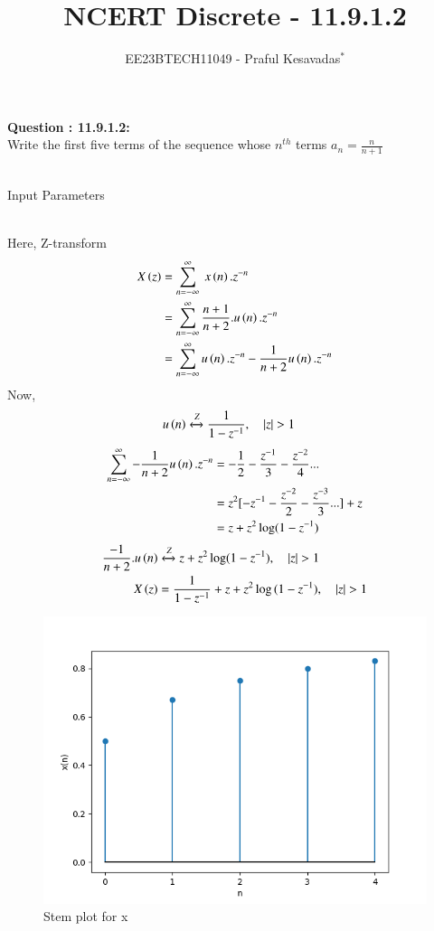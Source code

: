 \documentclass[journal,12pt,onecolumn]{IEEEtran}
\theoremstyle{remark}
\begin{document}

\vspace{3cm}

\title{NCERT Discrete - 11.9.1.2}
\author{EE23BTECH11049 - Praful Kesavadas$^{*}$%
}
\maketitle

\bigskip

\renewcommand{\thefigure}{\theenumi}
\renewcommand{\thetable}{\theenumi}

\textbf{Question : 11.9.1.2:}\\
Write the first five terms of the sequence whose $n^{th}$ terms  $a_n = \frac{n}{n+1}$\\
\solution\\
\begin{table}[ht!]
\centering

\caption{Input Parameters}
\end{table}\\
Here, Z-transform
\begin{align}
X\left(z\right) &= \sum_{n=-\infty}^\infty\ x\left(n\right).z^{-n}\\
&= \sum_{n=-\infty}^\infty \frac{n+1}{n+2}.u\left(n\right). z^{-n}\\
&= \sum_{n=-\infty}^\infty u\left(n\right).z^{-n} - \frac{1}{n+2} u\left(n\right).z^{-n}
\end{align}
Now, 
\begin{align}
u\brak{n} &\xleftrightarrow Z  \frac{1}{1-z^{-1}}, \quad{|z|>1}
\end{align}
\begin{align*}
\sum_{n=-\infty}^\infty - \frac{1}{n+2} u\left(n\right).z^{-n} &= -\frac{1}{2}-\frac{z^{-1}}{3}-\frac{z^{-2}}{4}...\\
&= z^2[-z^{-1}-\frac{z^{-2}}{2}-\frac{z^{-3}}{3}...]+z \\
&= z+ z^2\log(1-z^{-1})
\end{align*}
\begin{align}
\frac{-1}{n+2}.u\brak{n} &\xleftrightarrow Z  z+z^2\log(1-z^{-1}), \quad{|z|>1}\\
X\brak{z} &= \frac{1}{1-z^{-1}} + z+ z^2\log{(1-z^{-1})} ,\quad{|z|>1}
\end{align}
\begin{figure}[ht!]
    \centering
    \includegraphics[width=\columnwidth]{figs/graph1.png}
    \caption{Stem plot for x}
    \label{fig:11.9.1.2fig1}
\end{figure}
\end{document}
